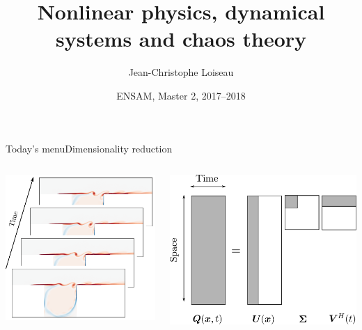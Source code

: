 \documentclass[usenames,dvipsnames,svgnames,10pt,aspectratio=169]{beamer}
\title[Nonlinear Physics] %
{
	Nonlinear physics, dynamical \\ systems and chaos theory
}
\author[J.-Ch.~Loiseau] %
{
	Jean-Christophe Loiseau
}
\institute[unused]
{
	\url{jean-christophe.loiseau@ensam.eu} \\
	DynFluid, \\
	Arts et M\'etiers ParisTech, France
}
\date[unused]{ENSAM, Master 2, 2017--2018}
\begin{document}
\titleframe %


\begin{frame}[t, c]{Today's menu}{Dimensionality reduction}
	\centering
	\begin{columns}
		\begin{column}{.33\textwidth}
			\centering
			\includegraphics[width=\columnwidth]{dimensionality_reduction}
		\end{column}
		\begin{column}{.4\textwidth}
			\centering
			\includegraphics[width=\columnwidth]{svd}
		\end{column}
	\end{columns}


\end{frame}
\end{document}
